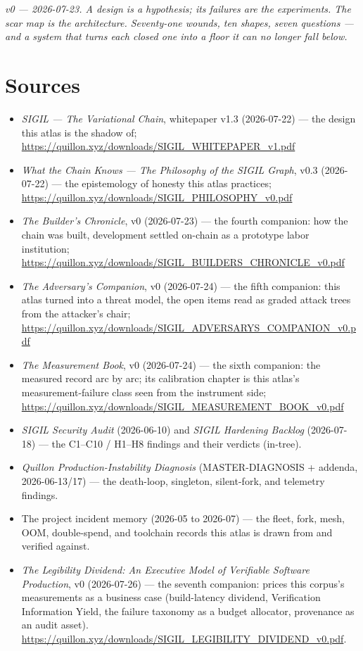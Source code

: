 \documentclass[10pt,a4paper]{article}
\begin{document}
\vspace{0.6em}
\noindent\textit{v0 — 2026-07-23. A design is a hypothesis; its failures are the
experiments. The scar map is the architecture. Seventy-one wounds, ten shapes, seven
questions — and a system that turns each closed one into a floor it can no longer fall
below.}

\section*{Sources}

\small
\begin{itemize}[leftmargin=1.2em,itemsep=1pt]
\item \emph{SIGIL — The Variational Chain}, whitepaper v1.3 (2026-07-22) — the design
this atlas is the shadow of; \url{https://quillon.xyz/downloads/SIGIL_WHITEPAPER_v1.pdf}
\item \emph{What the Chain Knows — The Philosophy of the SIGIL Graph}, v0.3 (2026-07-22) —
the epistemology of honesty this atlas practices;
\url{https://quillon.xyz/downloads/SIGIL_PHILOSOPHY_v0.pdf}
\item \emph{The Builder's Chronicle}, v0 (2026-07-23) — the fourth companion: how the
chain was built, development settled on-chain as a prototype labor institution;
\url{https://quillon.xyz/downloads/SIGIL_BUILDERS_CHRONICLE_v0.pdf}
\item \emph{The Adversary's Companion}, v0 (2026-07-24) — the fifth companion: this
atlas turned into a threat model, the open items read as graded attack trees from the
attacker's chair; \url{https://quillon.xyz/downloads/SIGIL_ADVERSARYS_COMPANION_v0.pdf}
\item \emph{The Measurement Book}, v0 (2026-07-24) — the sixth companion: the measured
record arc by arc; its calibration chapter is this atlas's measurement-failure class
seen from the instrument side;
\url{https://quillon.xyz/downloads/SIGIL_MEASUREMENT_BOOK_v0.pdf}
\item \emph{SIGIL Security Audit} (2026-06-10) and \emph{SIGIL Hardening Backlog}
(2026-07-18) — the C1--C10 / H1--H8 findings and their verdicts (in-tree).
\item \emph{Quillon Production-Instability Diagnosis} (MASTER-DIAGNOSIS + addenda,
2026-06-13/17) — the death-loop, singleton, silent-fork, and telemetry findings.
\item The project incident memory (2026-05 to 2026-07) — the fleet, fork, mesh, OOM,
double-spend, and toolchain records this atlas is drawn from and verified against.
\item \emph{The Legibility Dividend: An Executive Model of Verifiable Software Production}, v0 (2026-07-26) --- the seventh companion: prices this corpus's measurements as a business case (build-latency dividend, Verification Information Yield, the failure taxonomy as a budget allocator, provenance as an audit asset). \url{https://quillon.xyz/downloads/SIGIL_LEGIBILITY_DIVIDEND_v0.pdf}.
\end{itemize}
\end{document}

